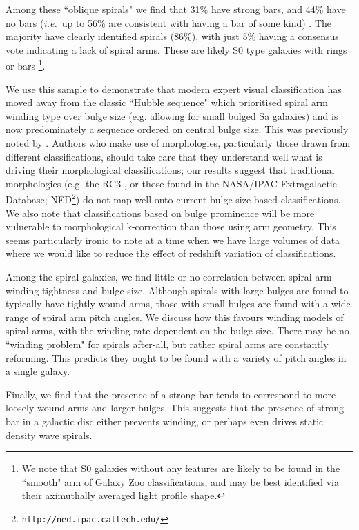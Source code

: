 \documentclass[usenatbib]{mn2e}
\newcommand{\ie}{{\it i.e.}}
\begin{document}
 Among these ``oblique spirals" we find that {31\%} have strong bars, and {44\%} have no bars (\ie ~up to 56\% are consistent with having a bar of some kind) . The majority have clearly identified spirals ({86\%}), with just {5\%} having a consensus vote indicating a lack of spiral arms. These are likely S0 type galaxies with rings or bars \footnote{We note that S0 galaxies without any features are likely to be found in the ``smooth" arm of Galaxy Zoo classifications, and may be best identified via their aximuthally averaged light profile shape.}. 
 
 We use this sample to demonstrate that modern expert visual classification has moved away from the classic ``Hubble sequence" which prioritised spiral arm winding type over bulge size (e.g. allowing for small bulged Sa galaxies) and is now predominately a sequence ordered on central bulge size. This was previously noted by \citet{Willett2013}. Authors who make use of morphologies, particularly those drawn from different classifications, should take care that they understand well what is driving their morphological classifications; our results suggest that traditional morphologies (e.g. the RC3 \citep{1991rc3..book.....D}, or those found in the NASA/IPAC Extragalactic Database; NED\footnote{\tt http://ned.ipac.caltech.edu/}) do not map well onto current bulge-size based classifications. We also note that classifications based on bulge prominence will be more vulnerable to morphological k-correction 
than those using arm geometry. This seems particularly ironic to note at a time when we have large volumes of data where we would like to reduce the effect of redshift variation of classifications. 
 
Among the spiral galaxies, we find little or no correlation between spiral arm winding tightness and bulge size. Although spirals with large bulges are found to typically have tightly wound  arms, those with small bulges are found with a wide range of spiral arm pitch angles. We discuss how this favours winding models of spiral arms, with the winding rate dependent on the bulge size. There may be no ``winding problem" for spirals after-all, but rather spiral arms are constantly reforming. This predicts they ought to be found with a variety of pitch angles in a single galaxy. 

Finally, we find that the presence of a strong bar tends to correspond to more loosely wound arms and larger bulges. This suggests that the presence of strong bar in a galactic disc either prevents winding, or perhaps even drives static density wave spirals. 
\end{document}
